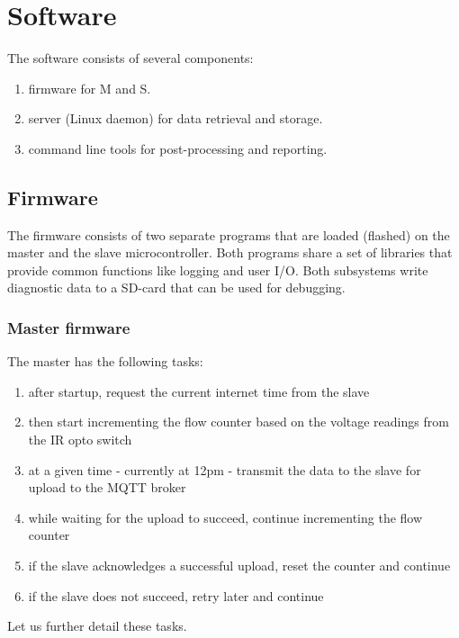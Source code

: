 \chapter{Software}

The software consists of several components:
\begin{enumerate}

    \item firmware for \mu M and \mu S.
    \item server (Linux daemon) for data retrieval and storage.
    \item command line tools for post-processing and reporting.
\end{enumerate}


\section{Firmware}

The firmware consists of two separate programs that are loaded (flashed) on the master and the slave microcontroller.
Both programs share a set of libraries that provide common functions like logging and user I/O.
Both subsystems write diagnostic data to a SD-card that can be used for debugging.


\subsection{Master firmware}

The master has the following tasks:

\begin{enumerate}
    \item after startup, request the current internet time from the slave
    \item then start incrementing the flow counter based on the voltage readings from the IR opto switch
    \item at a given time - currently at 12pm - transmit the data to the slave for upload to the MQTT broker
    \item while waiting for the upload to succeed, continue incrementing the flow counter
    \item if the slave acknowledges a successful upload, reset the counter and continue
    \item if the slave does not succeed, retry later and continue
\end{enumerate}

Let us further detail  these tasks.




